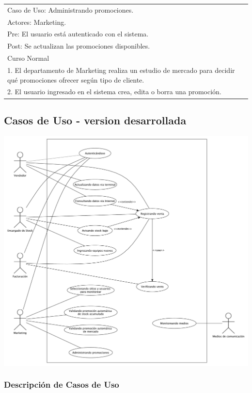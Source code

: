 \vspace{1cm}

\begin{tabular}{ | p{14cm} | }
  \hline
  Caso de Uso: Administrando promociones. \\
  Actores: Marketing. \\
  Pre: El usuario está autenticado con el sistema. \\
  Post: Se actualizan las promociones disponibles. \\
  \hline
  Curso Normal\\
  \hline
  1. El departamento de Marketing realiza un estudio de mercado para decidir qué promociones ofrecer según tipo de cliente. \\
  2. El usuario ingresado en el sistema crea, edita o borra una promoción. \\
  \hline
\end{tabular}

\subsection{Casos de Uso -  version desarrollada}

\includegraphics[width=1.1\textwidth]{./imagenes/casos_de_uso.pdf}

\clearpage

\subsubsection{Descripción de Casos de Uso}

